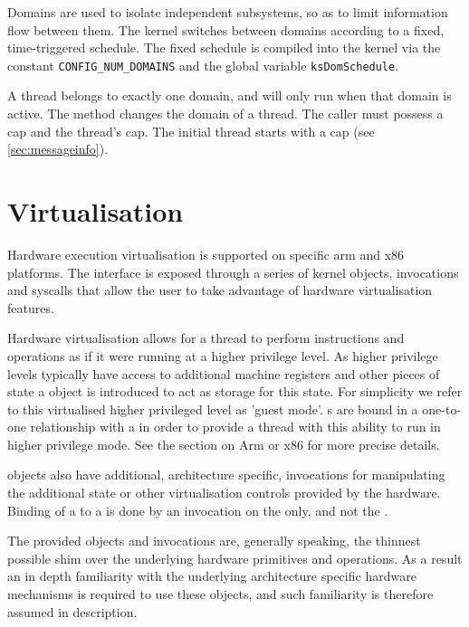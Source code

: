 Domains are used to isolate independent subsystems, so as to limit
information flow between them.
The kernel switches between domains according to a fixed, time-triggered
schedule.
The fixed schedule is compiled into the kernel via the constant
\texttt{CONFIG\_NUM\_DOMAINS} and the global variable \texttt{ksDomSchedule}.

A thread belongs to exactly one domain, and will only run when that domain
is active.
The  method changes the domain
of a thread.
The caller must possess a  cap and the thread's  cap.
The initial thread starts with a  cap (see
\autoref{sec:messageinfo}).

\section{Virtualisation}
\label{sec:virt}

Hardware execution virtualisation is supported on specific arm and x86 platforms. The interface is exposed through a series
of kernel objects, invocations and syscalls that allow the user to take advantage of hardware
virtualisation features.

Hardware virtualisation allows for a thread to perform instructions and operations as if it were
running at a higher privilege level. As higher privilege levels typically have access to
additional machine registers and other pieces of state a  object is introduced to act
as storage for this state. For simplicity we refer to this virtualised higher privileged level as
'guest mode'. s are bound in a one-to-one relationship with a  in order
to provide a thread with this ability to run in higher privilege mode. See the section on
Arm or x86 for more precise details.

 objects also have additional, architecture specific, invocations for manipulating
the additional state or other virtualisation controls provided by the hardware. Binding of
a  to a  is done by an invocation on the  only, and not the .

The provided objects and invocations are, generally speaking, the thinnest possible shim over
the underlying hardware primitives and operations. As a result an in depth familiarity with
the underlying architecture specific hardware mechanisms is required to use these objects, and
such familiarity is therefore assumed in description.


